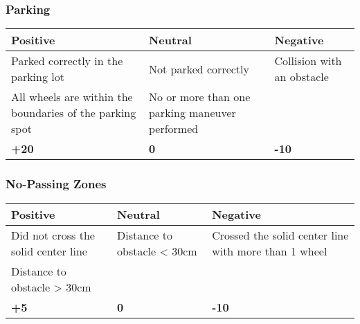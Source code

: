 {\begin{highlight}
		\newpage

		\subsubsection*{Parking}
		\begin{table}[H]
			\begin{tabularx}{\textwidth}{XXX}
				\toprule
				\textbf{Positive}                                        & \textbf{Neutral}                               & \textbf{Negative}          \\
				\midrule
				Parked correctly in the parking lot                      & Not parked correctly                           & Collision with an obstacle \\
				All wheels are within the boundaries of the parking spot & No or more than one parking maneuver performed &                            \\
				\topstrut
				\textbf{+20}                                             & \textbf{0}                                     & \textbf{-10}               \\
				\bottomrule
			\end{tabularx}
		\end{table}

		\subsubsection*{No-Passing Zones}
		\begin{table}[H]
			\begin{tabularx}{\textwidth}{XXX}
				\toprule
				\textbf{Positive}                   & \textbf{Neutral}            & \textbf{Negative}                                    \\
				\midrule
				Did not cross the solid center line & Distance to obstacle < 30cm & Crossed the solid center line with more than 1 wheel \\
				Distance to obstacle > 30cm         &                             &                                                      \\
				\topstrut
				\textbf{+5}                         & \textbf{0}                  & \textbf{-10}                                         \\
				\bottomrule
			\end{tabularx}
		\end{table}


\end{highlight}}
